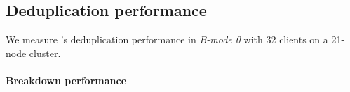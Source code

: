 \subsection{Deduplication performance}

We measure \sysname's deduplication performance in \emph{B-mode 0}
with 32 clients on a 21-node cluster.


\paragraph{Breakdown performance}



